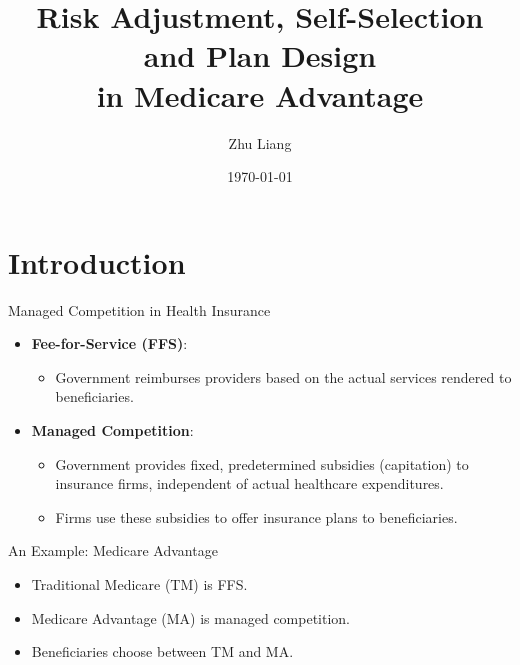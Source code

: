 \documentclass[professionalfonts, aspectratio=169]{beamer}
\title{Risk Adjustment, Self-Selection and Plan Design \\ in Medicare Advantage}
\institute{Stony Brook University}
\author{Zhu Liang}
\date{\today}
\begin{document}

\begin{frame} %
    \titlepage
\end{frame}

\section{Introduction}

\begin{frame}{Managed Competition in Health Insurance}
  \begin{itemize}
    \item \textbf{Fee-for-Service (FFS)}:
      \begin{itemize}
        \item Government reimburses providers based on the actual services rendered to beneficiaries.
      \end{itemize}
    \item \textbf{Managed Competition}:
      \begin{itemize}
        \item Government provides fixed, predetermined subsidies (capitation) to insurance firms, independent of actual healthcare expenditures.
        \item Firms use these subsidies to offer insurance plans to beneficiaries.
      \end{itemize}
  \end{itemize}
\end{frame}    

\begin{frame}{An Example: Medicare Advantage}
\begin{figure}
  \centering
  \resizebox{0.6\textwidth}{!}{}
\end{figure}

\begin{itemize}\small
  \item Traditional Medicare (TM) is FFS.
  \item Medicare Advantage (MA) is managed competition.
  \item Beneficiaries choose between TM and MA.
\end{itemize}
\end{frame}
\end{document}
